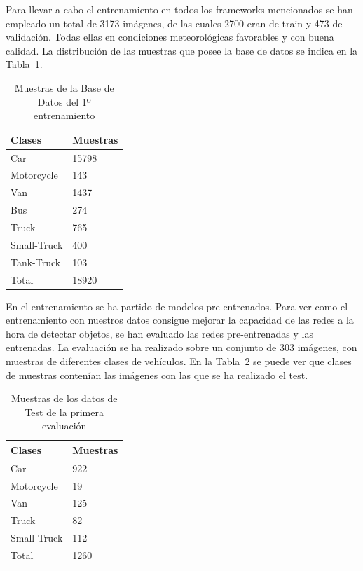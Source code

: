 Para llevar a cabo el entrenamiento en todos los frameworks mencionados se han empleado un total de 3173 imágenes, de las cuales 2700 eran de train y 473 de validación. Todas ellas en condiciones meteorológicas favorables y con buena calidad. La distribución de las muestras que posee la base de datos se indica en la Tabla~\ref{tabla_database}.

\begin{table}[htbp][H] 
\begin{center}
\begin{tabular}{|l|l|}
\hline
Clases & Muestras \\
\hline \hline
Car & 15798 \\ \hline
Motorcycle & 143 \\ \hline
Van & 1437 \\ \hline
Bus & 274 \\ \hline
Truck & 765 \\ \hline
Small-Truck & 400 \\ \hline
Tank-Truck & 103 \\ \hline
Total & 18920 \\ \hline
\end{tabular}
\caption{Muestras de la Base de Datos del 1º entrenamiento}
\label{tabla_database}
\end{center}
\end{table}

En el entrenamiento se ha partido de modelos pre-entrenados. Para ver como el entrenamiento con nuestros datos consigue mejorar la capacidad de las redes a la hora de detectar objetos, se han evaluado las redes pre-entrenadas y las entrenadas. La evaluación se ha realizado sobre un conjunto de 303 imágenes, con muestras de diferentes clases de vehículos. En la Tabla~\ref{tabla_datos_primera_evaluacion} se puede ver que clases de muestras contenían las imágenes con las que se ha realizado el test.

\begin{table}[htbp][H] 
\begin{center}
\begin{tabular}{|l|l|}
\hline
Clases & Muestras \\
\hline \hline
Car & 922 \\ \hline
Motorcycle & 19 \\ \hline
Van & 125 \\ \hline
Truck & 82 \\ \hline
Small-Truck & 112 \\ \hline
Total & 1260 \\ \hline
\end{tabular}
\caption{Muestras de los datos de Test de la primera evaluación}
\label{tabla_datos_primera_evaluacion}
\end{center}
\end{table}

